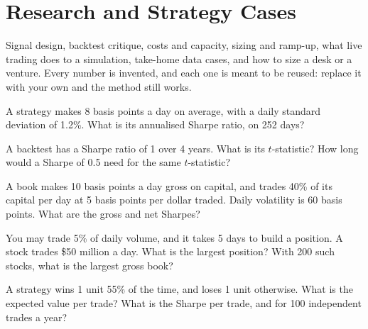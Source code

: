 \chapter{Research and Strategy Cases}\label{ch:iv2:research-and-strategy-cases}

\begin{ivtrains}
Signal design, backtest critique, costs and capacity, sizing and ramp-up, what live trading does to a simulation, take-home data cases, and how to size a desk or a venture. Every number is invented, and each one is meant to be reused: replace it with your own and the method still works.
\end{ivtrains}

\begin{question}\label{iq:iv2:research-and-strategy-cases:1}
A strategy makes 8 basis points a day on average, with a daily standard deviation of 1.2\%. What is its annualised Sharpe ratio, on 252 days?
\end{question}

\begin{question}\label{iq:iv2:research-and-strategy-cases:2}
A backtest has a Sharpe ratio of 1 over 4 years. What is its $t$-statistic? How long would a Sharpe of 0.5 need for the same $t$-statistic?
\end{question}

\begin{question}\label{iq:iv2:research-and-strategy-cases:3}
A book makes 10 basis points a day gross on capital, and trades 40\% of its capital per day at 5 basis points per dollar traded. Daily volatility is 60 basis points. What are the gross and net Sharpes?
\end{question}

\begin{question}\label{iq:iv2:research-and-strategy-cases:4}
You may trade 5\% of daily volume, and it takes 5 days to build a position. A stock trades \$50 million a day. What is the largest position? With 200 such stocks, what is the largest gross book?
\end{question}

\begin{question}\label{iq:iv2:research-and-strategy-cases:5}
A strategy wins 1 unit 55\% of the time, and loses 1 unit otherwise. What is the expected value per trade? What is the Sharpe per trade, and for 100 independent trades a year?
\end{question}

